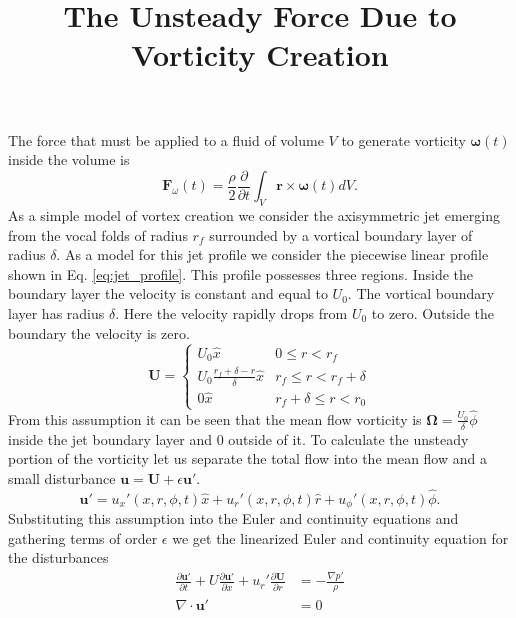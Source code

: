 \documentclass[superscriptaddress, onecolumn, prl]{revtex4}
\begin{document}
\title{The Unsteady Force Due to Vorticity Creation}
\maketitle
The force that must be applied to a fluid of volume $V$ to generate vorticity $\boldsymbol{\omega}(t)$ inside the volume is 
\begin{equation}
\textbf{F}_{\omega}(t) = \frac{\rho}{2} \frac{\partial}{\partial t} \int_V \textbf{r} \times \boldsymbol{\omega}(t) dV.
\end{equation}
As a simple model of vortex creation we consider the axisymmetric jet emerging from the vocal folds of radius $r_f$ surrounded by a vortical boundary layer of radius $\delta$. As a model for this jet profile we consider the piecewise linear profile shown in Eq. \ref{eq:jet_profile}. This profile possesses three regions. Inside the boundary layer the velocity is constant and equal to $U_0$. The vortical boundary layer has radius $\delta$. Here the velocity rapidly drops from $U_0$ to zero. Outside the boundary the velocity is zero.
\begin{equation}
\label{eq:jet_profile}
\textbf{U} = 
\begin{cases}
U_0 \hat{x} & 0 \leq r < r_f \\
U_0\frac{r_f + \delta - r}{\delta}\hat{x} & r_f \leq r < r_f + \delta \\
0 \hat{x} & r_f + \delta \leq r < r_0
\end{cases}
\end{equation}
From this assumption it can be seen that the mean flow vorticity is $\boldsymbol{\Omega} = \frac{U_0}{\delta} \hat{\phi}$ inside the jet boundary layer and $0$ outside of it. To calculate the unsteady portion of the vorticity let us separate the total flow into the mean flow and a small disturbance $\textbf{u} = \textbf{U} + \epsilon \textbf{u}'$.
\begin{equation}
\textbf{u}' = u_x'(x, r, \phi, t) \hat{x} + u_r'(x, r, \phi, t)  \hat{r} + u_\phi'(x, r, \phi, t)  \hat{\phi}.
\end{equation}
Substituting this assumption into the Euler and continuity equations and gathering terms of order $\epsilon$ we get the linearized Euler and continuity equation for the disturbances
\begin{equation}
\begin{split}
\label{eq:linear_disturbance}
\frac{\partial \textbf{u}' }{\partial t} + U \frac{\partial \textbf{u}'}{\partial x} + u_r' \frac{\partial \textbf{U}}{\partial r} &= -\frac{\nabla p'}{\rho} \\
\nabla \cdot \textbf{u}' &= 0 
\end{split}
\end{equation} 
\end{document}
